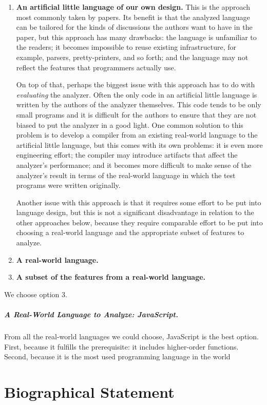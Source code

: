 \documentclass[12pt, oneside]{book}
\begin{document}
\begin{enumerate}
  \item \textbf{An artificial little language of our own design.} This is the approach most commonly taken by papers. Its benefit is that the analyzed language can be tailored for the kinds of discussions the authors want to have in the paper, but this approach has many drawbacks: the language is unfamiliar to the readers; it becomes impossible to reuse existing infrastructure, for example, parsers, pretty-printers, and so forth; and the language may not reflect the features that programmers actually use.
  
  On top of that, perhaps the biggest issue with this approach has to do with \emph{evaluating} the analyzer. Often the only code in an artificial little language is written by the authors of the analyzer themselves. This code tends to be only small programs and it is difficult for the authors to ensure that they are not biased to put the analyzer in a good light. One common solution to this problem is to develop a compiler from an existing real-world language to the artificial little language, but this comes with its own problems: it is even more engineering effort; the compiler may introduce artifacts that affect the analyzer’s performance; and it becomes more difficult to make sense of the analyzer’s result in terms of the real-world language in which the test programs were written originally.
  
  Another issue with this approach is that it requires some effort to be put into language design, but this is not a significant disadvantage in relation to the other approaches below, because they require comparable effort to be put into choosing a real-world language and the appropriate subset of features to analyze.

  \item \textbf{A real-world language.}

  \item \textbf{A subset of the features from a real-world language.}
\end{enumerate}

We choose option 3.

\paragraph{A Real-World Language to Analyze: JavaScript.}

From all the real-world languages we could choose, JavaScript is the best option. First, because it fulfills the prerequisite: it includes higher-order functions. Second, because it is the most used programming language in the world~\cite{stack-overflow-developer-survey, jet-brains-developer-survey}

\appendix


\backmatter




\chapter{Biographical Statement}

\end{document}
